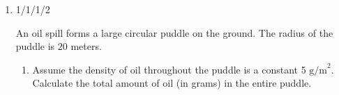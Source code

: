 \documentclass{article}
\begin{document}
\begin{enumerate}
\begin{enumerate}
\begin{solution}
\end{solution}

\end{enumerate}

\pspace{\newpage}






\item 

\begin{grading}
    1/1/1/2
\end{grading}

\begin{problem}
An oil spill forms a large circular puddle on the ground. The radius of the puddle is 20 meters. 
\end{problem}

\begin{enumerate} 

\item 
\begin{problem}
Assume the density of oil throughout the puddle is a constant 5 $\text{g/m}^2$. Calculate the total amount of oil (in grams) in the entire puddle.
\end{problem}
\pspace{\vfill}


\end{enumerate}
\end{enumerate}
\end{document}
